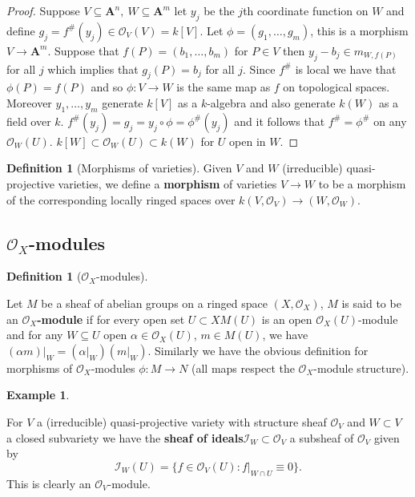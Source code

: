 \documentclass[10pt,]{book}
\newcommand{\terminology}[1]{\textbf{#1}}
\theoremstyle{plain}
\theoremstyle{definition}
\newtheorem{definition}[theorem]{Definition}
\newtheorem{example}[theorem]{Example}
\newcommand{\bfA}{\mathbf{A}}
\newcommand{\cI}{\mathcal{I}}
\newcommand{\cO}{\mathcal{O}}
\begin{document}
\begin{proof}
Suppose \(V\subseteq \bfA^n,\ W\subseteq\bfA^m\) let \(y_j\) be the \(j\)th coordinate function on \(W\) and define \(g_j = f^\#(y_j) \in \cO_V(V) = k[V]\).
            Let \(\phi = (g_1,\ldots,g_m)\), this is a morphism \(V \to \bfA^m\).
            Suppose that \(f(P) = (b_1,\ldots,b_m)\) for \(P\in V\) then \(y_j - b_j \in m_{W,f(P)}\) for all \(j\) which implies that \(g_j(P) = b_j\) for all \(j\).
            Since \(f^\#\) is local we have that \(\phi(P) = f(P)\) and so \(\phi \colon V \to W\) is the same map as \(f\) on topological spaces.
            Moreover \(y_1,\ldots,y_m\) generate \(k[V]\) as a \(k\)-algebra and also generate \(k(W)\) as a field over \(k\). \(f^\#(y_j) = g_j = y_j\circ\phi = \phi^\#(y_j)\) and it follows that \(f^\# = \phi^\#\) on any \(\cO_W(U)\).
            \(k[W] \subset \cO_W(U)\subset k(W)\) for \(U\) open in \(W\).
          \end{proof}
\begin{definition}[Morphisms of varieties]\label{definition-13}
Given \(V\) and \(W\) (irreducible) quasi-projective varieties, we define a \terminology{morphism} of varieties \(V \to W\) to be a morphism of the corresponding locally ringed spaces over \(k\)\((V,\cO_V)\to (W,\cO_W)\).\end{definition}
\typeout{************************************************}
\typeout{Subsection 1.2.1 \(\cO_X\)-modules}
\typeout{************************************************}
\subsection[\(\cO_X\)-modules]{\(\cO_X\)-modules}\label{subsection-1}
\begin{definition}[\(\cO_X\)-modules]\label{definition-14}

              Let \(M\) be a sheaf of abelian groups on a ringed space \((X,\cO_X)\), \(M\) is said to be an \terminology{\(\cO_X\)-module} if for every open set \(U\subset X\)\(M(U)\) is an open \(\cO_X(U)\)-module and for any \(W\subseteq U\) open \(\alpha \in \cO_X(U)\), \(m\in M(U)\), we have \((\alpha m)|_W = (\alpha|_W)(m|_W)\).
              Similarly we have the obvious definition for morphisms of \(\cO_X\)-modules \(\phi\colon M \to N\) (all maps respect the \(\cO_X\)-module structure).
            \end{definition}
\begin{example}\label{example-10}

              For \(V\) a (irreducible) quasi-projective variety with structure sheaf \(\cO_V\) and \(W \subset V\) a closed subvariety we have the \terminology{sheaf of ideals}\(\cI_W \subset \cO_V\) a subsheaf of \(\cO_V\) given by \[\cI_W(U) = \{f\in \cO_V(U) : f|_{W\cap U} \equiv 0\}.\]
              This is clearly an \(\cO_V\)-module.
            \end{example}
\end{document}
